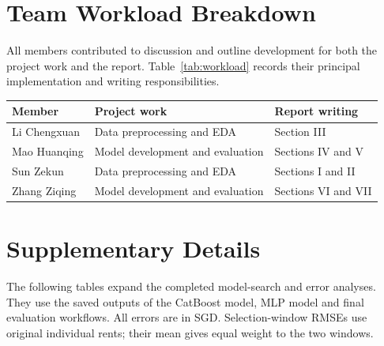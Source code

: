 \documentclass[conference]{IEEEtran}
\makeatletter
\newenvironment{localtable}{\par\addvspace{\medskipamount}\noindent
  \begin{minipage}{\columnwidth}\def\@captype{table}}{\end{minipage}\par
  \addvspace{\medskipamount}}
\makeatother
\begin{document}
\clearpage
\appendices
\section{Team Workload Breakdown}
\label{app:workload}
All members contributed to discussion and outline development for both the
project work and the report. Table~\ref{tab:workload} records their principal
implementation and writing responsibilities.
\begin{localtable}
  \caption{Team workload and report contributions. Student IDs appear in the author block.}
  \label{tab:workload}
  \centering\small
  \begin{tabularx}{\columnwidth}{lXX}
    \toprule
    Member & Project work & Report writing \\
    \midrule
    Li Chengxuan & Data preprocessing and EDA & Section III \\
    Mao Huanqing & Model development and evaluation & Sections IV and V \\
    Sun Zekun & Data preprocessing and EDA & Sections I and II \\
    Zhang Ziqing & Model development and evaluation & Sections VI and VII \\
    \bottomrule
  \end{tabularx}
\end{localtable}

\section{Supplementary Details}
\label{app:supplement}
The following tables expand the completed model-search and error analyses.
They use the saved outputs of the CatBoost model, MLP model and final
evaluation workflows. All errors are in SGD. Selection-window RMSEs use
original individual rents; their mean gives equal weight to the two windows.
\end{document}
